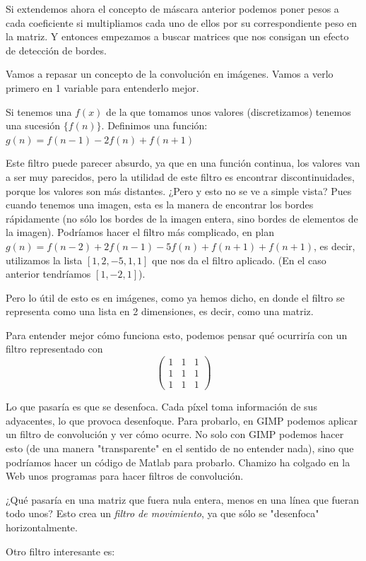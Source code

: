 		Si extendemos ahora el concepto de máscara anterior podemos poner pesos a cada coeficiente si multipliamos cada uno de ellos por su correspondiente peso en la matriz. Y entonces empezamos a buscar matrices que nos consigan un efecto de detección de bordes.

		Vamos a repasar un concepto de la convolución en imágenes. Vamos a verlo primero en 1 variable para entenderlo mejor.

		Si tenemos una $f(x)$ de la que tomamos unos valores (discretizamos) tenemos una sucesión $\{f(n)\}$. Definimos una función: $g(n) = f(n-1) - 2 f(n) + f(n+1)$

		Este filtro  puede parecer absurdo, ya que en una función continua, los valores van a ser muy parecidos, pero la utilidad de este filtro es encontrar discontinuidades, porque los valores son más distantes. ¿Pero y esto no se ve a simple vista? Pues cuando tenemos una imagen, esta es la manera de encontrar los bordes rápidamente (no sólo los bordes de la imagen entera, sino bordes de elementos de la imagen).
		Podríamos hacer el filtro más complicado, en plan $g(n) = f(n-2)+ 2f(n-1) - 5 f(n) + f(n+1) + f(n+1)$, es decir, utilizamos la lista $[1,2,-5,1,1]$ que nos da el filtro aplicado. (En el caso anterior tendríamos $[1,-2,1]$).

		Pero lo útil de esto es en imágenes, como ya hemos dicho, en donde el filtro se representa como una lista en 2 dimensiones, es decir, como una matriz.

		Para entender mejor cómo funciona esto, podemos pensar qué ocurriría con un filtro representado con \[ \begin{pmatrix} 1&1&1\\1&1&1\\1&1&1 \end{pmatrix} \]

		Lo que pasaría es que se desenfoca. Cada píxel toma información de sus adyacentes, lo que provoca desenfoque. Para probarlo, en GIMP  podemos aplicar un filtro de convolución y ver cómo ocurre. No solo con GIMP podemos hacer esto (de una manera "transparente" en el sentido de no entender nada), sino que podríamos hacer un código de Matlab para probarlo. Chamizo ha colgado en la Web unos programas para hacer filtros de convolución.

		¿Qué pasaría en una matriz que fuera nula entera, menos en una línea que fueran todo unos?  Esto crea un \emph{filtro de movimiento}, ya que sólo se "desenfoca" horizontalmente.


		Otro filtro interesante es:

